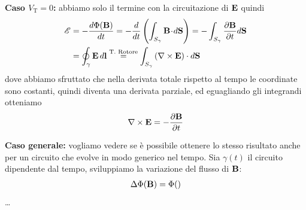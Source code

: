 \textbf{Caso $ V_{\text{T}} = 0$:} abbiamo solo il termine con la circuitazione di $ \mathbf{ E } $ quindi
\begin{align}
  \mathscr{E} &= - \frac{d \Phi(\mathbf{ B })}{dt} = -\frac{d}{dt} \left( \int_{S_{\gamma}} \mathbf{ B }\! \cdot\! d\mathbf{ S } \right) 
  = - \int_{S_{\gamma}} \frac{\partial \mathbf{ B } }{\partial t } d\mathbf{ S }
  \\ &= \oint_{\gamma} \mathbf{ E } \, d\mathbf{ l } \overset{\text{T. Rotore}}{=}
   \int_{S_{\gamma}} \left( \mathbf{\nabla}\times\mathbf{ E } \right) \cdot d\mathbf{ S }
\end{align}
dove abbiamo sfruttato che nella derivata totale rispetto al tempo le coordinate sono costanti, quindi diventa una derivata parziale, ed eguagliando gli 
integrandi otteniamo
\begin{equation} \label{eq:rotore_E_der_B}
  \mathbf{\nabla}\times\mathbf{ E } = - \frac{\partial \mathbf{ B } }{\partial t }
\end{equation}

\textbf{Caso generale:} vogliamo vedere se è possibile ottenere lo stesso risultato anche per un circuito che evolve in modo generico nel tempo.
Sia $ \gamma (t) $ il circuito dipendente dal tempo, sviluppiamo la variazione del flusso di $ \mathbf{ B } $:
\begin{align}
  \Delta \Phi (\mathbf{ B }) = \Phi ()
\end{align}
\dots

